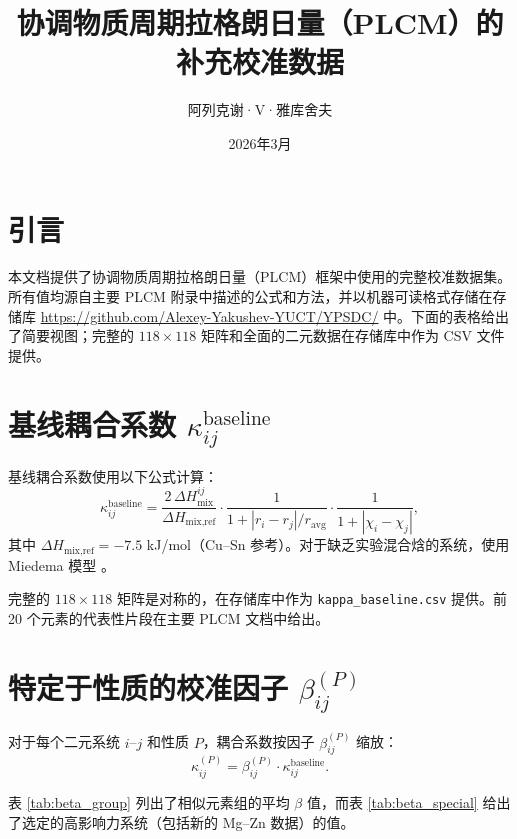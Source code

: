 \documentclass[12pt,a4paper]{article}
\title{协调物质周期拉格朗日量（PLCM）的补充校准数据}
\author{阿列克谢·V·雅库舍夫}
\date{2026年3月}
\begin{document}
	\maketitle
	
	\tableofcontents
	\newpage
	
	\section{引言}
	本文档提供了协调物质周期拉格朗日量（PLCM）框架中使用的完整校准数据集。所有值均源自主要 PLCM 附录中描述的公式和方法，并以机器可读格式存储在存储库 \url{https://github.com/Alexey-Yakushev-YUCT/YPSDC/} 中。下面的表格给出了简要视图；完整的 $118\times118$ 矩阵和全面的二元数据在存储库中作为 CSV 文件提供。
	
	\section{基线耦合系数 $\kappa_{ij}^{\text{baseline}}$}
	基线耦合系数使用以下公式计算：
	\[
	\kappa_{ij}^{\text{baseline}} = \frac{2\,\Delta H_{\text{mix}}^{ij}}{\Delta H_{\text{mix,ref}}} \cdot
	\frac{1}{1 + |r_i - r_j|/r_{\text{avg}}} \cdot
	\frac{1}{1 + |\chi_i - \chi_j|},
	\]
	其中 $\Delta H_{\text{mix,ref}} = -7.5$ kJ/mol（Cu–Sn 参考）。对于缺乏实验混合焓的系统，使用 Miedema 模型 \cite{Miedema1980}。
	
	完整的 $118\times118$ 矩阵是对称的，在存储库中作为 \texttt{kappa\_baseline.csv} 提供。前 20 个元素的代表性片段在主要 PLCM 文档中给出。
	
	\section{特定于性质的校准因子 $\beta_{ij}^{(P)}$}
	对于每个二元系统 $i$–$j$ 和性质 $P$，耦合系数按因子 $\beta_{ij}^{(P)}$ 缩放：
	\[
	\kappa_{ij}^{(P)} = \beta_{ij}^{(P)} \cdot \kappa_{ij}^{\text{baseline}}.
	\]
	
	表 \ref{tab:beta_group} 列出了相似元素组的平均 $\beta$ 值，而表 \ref{tab:beta_special} 给出了选定的高影响力系统（包括新的 Mg–Zn 数据）的值。
	
\end{document}
